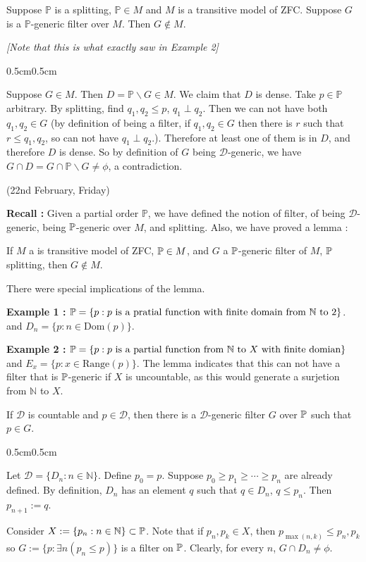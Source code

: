 \documentclass[12pt,a4paper]{article}
\newenvironment{proof}
{\begin{changemargin}{0.5cm}{0.5cm} 
	}%
	{\end{changemargin}
}
\newenvironment{p}
{\begin{proof} 
	}%
	{\end{proof}
}
\begin{document}
\lem Suppose $\mathbb{P}$ is a splitting, $\mathbb{P} \in M$ and $M$ is a transitive model of ZFC. Suppose $G$ is a $\mathbb{P}$-generic filter over $M$. Then $G\not\in M$.

\emph{[Note that this is what exactly saw in Example 2]}
\begin{p}
\pf Suppose $G\in M$. Then $D= \mathbb{P} \backslash G \in M$. We claim that $D$ is dense. Take $p\in\mathbb{P}$ arbitrary. By splitting, find $q_1, q_2\leq p$, $q_1 \perp q_2$. Then we can not have both $q_1, q_2 \in G$ (by definition of being a filter, if $q_1, q_2\in G$ then there is $r$ such that $r\leq q_1, q_2$, so can not have $q_1 \perp q_2$.). Therefore at least one of them  is in $D$, and therefore $D$ is dense. So by definition of $G$ being $\mathscr{D}$-generic, we have $G\cap D = G\cap \mathbb{P}\backslash G \neq \phi$, a contradiction.

\eop
\end{p}
\s

\newday

(22nd February, Friday)
\s

\textbf{Recall :} Given a partial order $\mathbb{P}$, we have defined the notion of filter, of being $\mathscr{D}$-generic, being $\mathbb{P}$-generic over $M$, and splitting. Also, we have proved a lemma :
\s

\lem If $M$ a is transitive model of ZFC, $\mathbb{P} \in M$, and $G$ a $\mathbb{P}$-generic filter of $M$, $\mathbb{P}$ splitting, then $G\not \in M$.
\s

There were special implications of the lemma.
\s

\textbf{Example 1 :} $\mathbb{P}  =  \{p : p \text{ is a pratial function with finite domain from }\mathbb{N}\text{ to }2\}$. and $D_n = \{p : n\in \text{Dom}(p) \}$.

\textbf{Example 2 :} $\mathbb{P} = \{ p: p \text{ is a partial function from } \mathbb{N} \text{ to }X \text{ with finite domian}\}$ and $E_x = \{p : x\in \text{Range}(p)\}$. The lemma indicates that this can not have a filter that is $\mathbb{P}$-generic if $X$ is uncountable, as this would generate a surjetion from $\mathbb{N}$ to $X$.
\s

\lem If $\mathscr{D}$ is countable and $p\in \mathscr{D}$, then there is a $\mathscr{D}$-generic filter $G$ over $\mathbb{P}$ such that $p\in G$.
\begin{p}
\pf Let $\mathscr{D} = \{D_n : n\in \mathbb{N}\}$. Define $p_0 =p$. Suppose $p_0 \geq p_1 \geq \cdots \geq p_n$ are already defined. By definition, $D_n$ has an element $q$ such that $q\in D_n$, $q\leq p_n$. Then $p_{n+1} := q$.

\quad Consider $X:= \{p_n : n\in \mathbb{N}\} \subset \mathbb{P}$. Note that if $p_n, p_k \in X$, then $p_{\max (n, k)} \leq p_n, p_k$ so $G:= \{p : \exists n (p_n \leq p) \}$ is a filter on $\mathbb{P}$. Clearly, for every $n$, $G\cap D_n \neq \phi$.

\eop
\end{p}
\s
\end{document}
